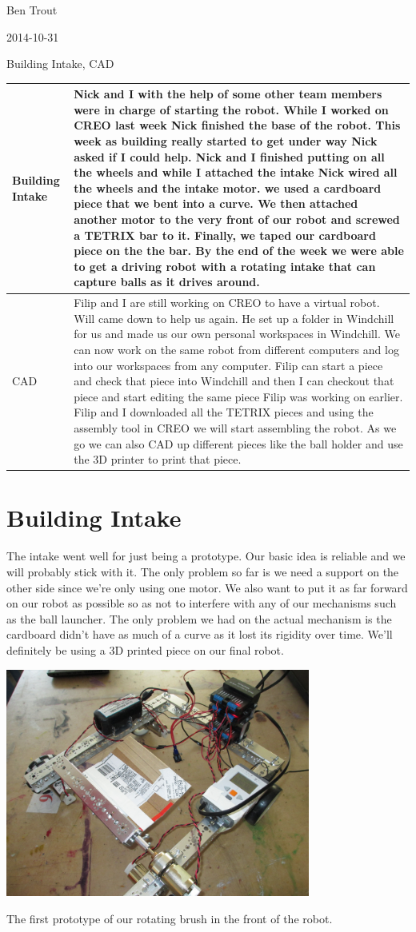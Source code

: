 Ben Trout

2014-10-31

Building Intake, CAD

\begin{tabular}{|p{5cm}|p{5cm}|}
\hline
 Building Intake&
Nick and I with the help of some other team members were in charge of starting the robot. While I worked on CREO last week Nick finished the base of the robot. This week as building really started to get under way Nick asked if I could help. Nick and I finished putting on all the wheels and while I attached the intake Nick wired all the wheels and the intake motor. we used a cardboard piece that we bent into a curve. We then attached another motor to the very front of our robot and screwed a TETRIX bar to it. Finally, we taped our cardboard piece on the the bar. By the end of the week we were able to get a driving robot with a rotating intake that can capture balls as it drives around. 
\\
\hline
 CAD&
Filip and I are still working on CREO to have a virtual robot. Will came down to help us again. He set up a folder in Windchill for us and made us our own personal workspaces in Windchill. We can now work on the same robot from different computers and log into our workspaces from any computer. Filip can start a piece and check that piece into Windchill and then I can checkout that piece and start editing the same piece Filip was working on earlier. Filip and I downloaded all the TETRIX pieces and using the assembly tool in CREO we will start assembling the robot. As we go we can also CAD up different pieces like the ball holder and use the 3D printer to print that piece. 
\\
\hline
\end{tabular}

\section*{Building Intake}
The intake went well for just being a prototype. Our basic idea is reliable and we will probably stick with it. The only problem so far is we need a support on the other side since we’re only using one motor. We also want to put it as far forward on our robot as possible so as not to interfere with any of our mechanisms such as the ball launcher. The only problem we had on the actual mechanism is the cardboard didn’t have as much of a curve as it lost its rigidity over time. We’ll definitely be using a 3D printed piece on our final robot. 


\begin{center}
\includegraphics[width=10cm]{./Entries/Images/FirstRotatingBrushProto.JPG}
\end{center}

The first prototype of our rotating brush in the front of the robot. 